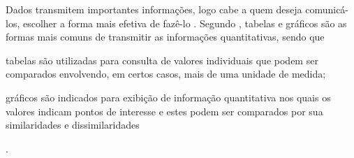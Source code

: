Dados transmitem importantes informações, logo cabe a quem deseja comunicá-los, escolher a forma mais efetiva de fazê-lo \cite{raquel2013}. Segundo , tabelas e gráficos são as formas mais comuns de transmitir as informações quantitativas, sendo que\begin{inparaenum}[i)]
\item tabelas são utilizadas para consulta de valores individuais que podem ser comparados envolvendo, em certos casos, mais de uma unidade de medida;
\item gráficos são indicados para exibição de informação quantitativa nos quais os valores indicam pontos de interesse e estes podem ser comparados por sua similaridades e dissimilaridades\end{inparaenum}. 
